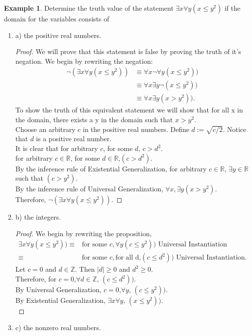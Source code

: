 \documentclass[letterpaper,10pt]{article}
\theoremstyle{plain}
\theoremstyle{definition}
\newtheorem{exmp}[thm]{Example}
\theoremstyle{remark}
\providecommand{\abs}[1]{\ensuremath{\left\lvert#1\right\rvert}}
\begin{document}
\begin{exmp}
Determine the truth value of the statement $\exists x \forall y (x\leq y^2)$
if the domain for the variables consists of
\newline
\begin{enumerate}
\item a) the positive real numbers.
\vspace{3cm}
\begin{proof}
We will prove that this statement is false by proving the truth of it's negation.
We begin by rewriting the negation:
\begin{align}
\lnot(\exists x \forall y (x\leq y^2))&\equiv \forall x \lnot \forall y (x\leq y^2))\\
&\equiv \forall x  \exists y \lnot  (x\leq y^2))\\
&\equiv \forall x  \exists y (x > y^2)).
\end{align}
To show the truth of this equivalent statement we will show that for all x in the domain, there exists a y in the domain such that $x>y^2$.
\\
Choose an arbitrary $c$ in the positive real numbers. Define $d:=\sqrt{c/2}$. Notice that $d$ is a positive real number.
\\
It is clear that for arbitrary $c$, for some $d$, $c>d^2$.\\
 for arbitrary $c\in \mathbb{R}$, for some $d\in \mathbb{R}$,$(c > d^2) $.\\
By the inference rule of Existential Generalization,
for arbitrary $c\in \mathbb{R}$, $\exists y \in \mathbb{R}$ such that $(c > y^2) $.\\
By the inference rule of Universal Generalization,
$\forall x, \exists y (x > y^2)$.\\
Therefore, $\lnot(\exists x \forall y (x\leq y^2))$.
\end{proof}
\newpage 
\item b) the integers.
\vspace{3cm}
\begin{proof}
We begin by rewriting the proposition,
\begin{align}
\exists x \forall y (x\leq y^2))\equiv& \text{for some } c,\forall y (c\leq y^2))\text{ Universal Instantiation}\\
\equiv& \text{for some } c,\text{for all d,} (c\leq d^2))\text{ Universal Instantiation}.
\end{align}
Let $c=0$ and $d\in \mathbb{Z}$. Then $\abs{d}\geq 0$ and $d^2\geq 0$.\\
Therefore, for $c=0$,$\forall d\in \mathbb{Z}$, $ (c\leq d^2))$.\\
By Universal Generalization, $c=0$,$\forall y$, $ (c\leq y^2))$.\\
By Existential Generalization, $\exists x$$\forall y$, $ (x\leq y^2))$.\\

\end{proof}
\noindent
\item c) the nonzero real numbers.
\vspace{3cm}
\newline
\end{enumerate}
\end{exmp}
\end{document}
